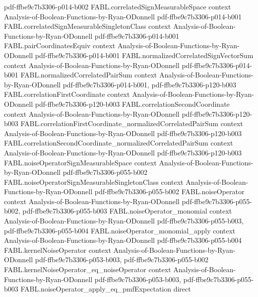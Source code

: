 \begin{theorem}
  {pdf-ffbe9c7b3306-p014-b002}
\proofstep
  {FABL.correlatedSignMeasurableSpace}
  {context}
  {Analysis-of-Boolean-Functions-by-Ryan-ODonnell}
  {pdf-ffbe9c7b3306-p014-b001}
\proofstep
  {FABL.correlatedSignMeasurableSingletonClass}
  {context}
  {Analysis-of-Boolean-Functions-by-Ryan-ODonnell}
  {pdf-ffbe9c7b3306-p014-b001}
\proofstep
  {FABL.pairCoordinatesEquiv}
  {context}
  {Analysis-of-Boolean-Functions-by-Ryan-ODonnell}
  {pdf-ffbe9c7b3306-p014-b001}
\proofstep
  {FABL.normalizedCorrelatedSignVectorSum}
  {context}
  {Analysis-of-Boolean-Functions-by-Ryan-ODonnell}
  {pdf-ffbe9c7b3306-p014-b001}
\proofstep
  {FABL.normalizedCorrelatedPairSum}
  {context}
  {Analysis-of-Boolean-Functions-by-Ryan-ODonnell}
  {pdf-ffbe9c7b3306-p014-b001,
    pdf-ffbe9c7b3306-p120-b003}
\proofstep
  {FABL.correlationFirstCoordinate}
  {context}
  {Analysis-of-Boolean-Functions-by-Ryan-ODonnell}
  {pdf-ffbe9c7b3306-p120-b003}
\proofstep
  {FABL.correlationSecondCoordinate}
  {context}
  {Analysis-of-Boolean-Functions-by-Ryan-ODonnell}
  {pdf-ffbe9c7b3306-p120-b003}
\proofstep
  {FABL.correlationFirstCoordinate_normalizedCorrelatedPairSum}
  {context}
  {Analysis-of-Boolean-Functions-by-Ryan-ODonnell}
  {pdf-ffbe9c7b3306-p120-b003}
\proofstep
  {FABL.correlationSecondCoordinate_normalizedCorrelatedPairSum}
  {context}
  {Analysis-of-Boolean-Functions-by-Ryan-ODonnell}
  {pdf-ffbe9c7b3306-p120-b003}
\proofstep
  {FABL.noiseOperatorSignMeasurableSpace}
  {context}
  {Analysis-of-Boolean-Functions-by-Ryan-ODonnell}
  {pdf-ffbe9c7b3306-p055-b002}
\proofstep
  {FABL.noiseOperatorSignMeasurableSingletonClass}
  {context}
  {Analysis-of-Boolean-Functions-by-Ryan-ODonnell}
  {pdf-ffbe9c7b3306-p055-b002}
\proofstep
  {FABL.noiseOperator}
  {context}
  {Analysis-of-Boolean-Functions-by-Ryan-ODonnell}
  {pdf-ffbe9c7b3306-p055-b002,
    pdf-ffbe9c7b3306-p055-b003}
\proofstep
  {FABL.noiseOperator_monomial}
  {context}
  {Analysis-of-Boolean-Functions-by-Ryan-ODonnell}
  {pdf-ffbe9c7b3306-p055-b003,
    pdf-ffbe9c7b3306-p055-b004}
\proofstep
  {FABL.noiseOperator_monomial_apply}
  {context}
  {Analysis-of-Boolean-Functions-by-Ryan-ODonnell}
  {pdf-ffbe9c7b3306-p055-b004}
\proofstep
  {FABL.kernelNoiseOperator}
  {context}
  {Analysis-of-Boolean-Functions-by-Ryan-ODonnell}
  {pdf-ffbe9c7b3306-p053-b003,
    pdf-ffbe9c7b3306-p055-b002}
\proofstep
  {FABL.kernelNoiseOperator_eq_noiseOperator}
  {context}
  {Analysis-of-Boolean-Functions-by-Ryan-ODonnell}
  {pdf-ffbe9c7b3306-p053-b003,
    pdf-ffbe9c7b3306-p055-b003}
\proofstep
  {FABL.noiseOperator_apply_eq_pmfExpectation}
  {direct}

\end{theorem}
